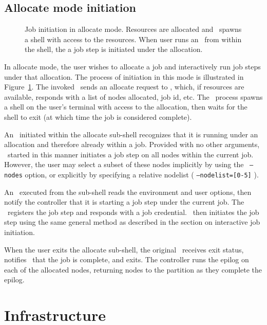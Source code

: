 \subsection{Allocate mode initiation}

\begin{figure}[tb]
\centerline{ }
\caption{\small Job initiation in allocate mode. Resources are allocated and
         \srun\ spawns a shell with access to the resources. When user runs 
	 an \srun\ from within the shell, the a job step is initiated under
	 the allocation.}
\label{init-allocate}
\end{figure}

In allocate mode, the user wishes to allocate a job and interactively run
job steps under that allocation. The process of initiation in this mode
is illustrated in Figure~\ref{init-allocate}. The invoked \srun\ sends
an allocate request to \slurmctld , which, if resources are available,
responds with a list of nodes allocated, job id, etc. The \srun\
process spawns a shell on the user's terminal with access to the
allocation, then waits for the shell to exit (at which time the job
is considered complete). 

An \srun\ initiated within the allocate sub-shell recognizes that it
is running under an allocation and therefore already within a job. Provided
with no other arguments, \srun\ started in this manner initiates a job
step on all nodes within the current job. However, the user may select
a subset of these nodes implicitly by using the \srun\ {\tt --nodes}  
option, or explicitly by specifying a relative nodelist 
( {\tt --nodelist=[0-5]} ). 

An \srun\ executed from the sub-shell reads the environment and
user options, then notify the controller that it is starting a job step
under the current job. The \slurmctld\ registers the job step and responds
with a job credential. \srun\ then initiates the job step using the same
general method as described in the section on interactive job initiation.

When the user exits the allocate sub-shell, the original \srun\ receives
exit status, notifies \slurmctld\ that the job is complete, and exits. 
The controller runs the epilog on each of the allocated nodes, returning
nodes to the partition as they complete the epilog.

\section{Infrastructure}

